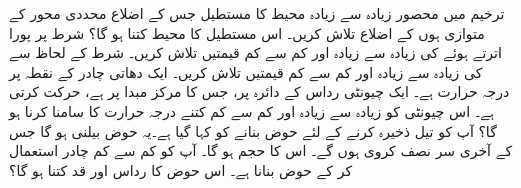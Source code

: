 ترخیم   میں محصور  زیادہ سے زیادہ محیط کا مستطیل جس کے اضلاع محددی  محور کے متوازی ہوں کے اضلاع  تلاش کریں۔ اس مستطیل کا محیط کتنا ہو گا؟
شرط    پر پورا  اترتے ہوئے   کی زیادہ سے زیادہ اور کم سے کم قیمتیں تلاش کریں۔
شرط  کے لحاظ سے  کی زیادہ سے زیادہ اور کم سے کم قیمتیں تلاش کریں۔
ایک دھاتی چادر کے نقطہ  پر درجہ حرارت  ہے۔ ایک چیونٹی  رداس   کے دائرہ پر،   جس کا مرکز مبدا پر ہے،   حرکت کرتی ہے۔ اس چیونٹی کو زیادہ سے زیادہ اور کم سے کم کتنے درجہ حرارت کا سامنا کرنا ہو گا؟ 
آپ کو  تیل ذخیرہ کرنے  کے لئے حوض  بنانے کو کہا گیا ہے۔یہ حوض بیلنی ہو گا جس کے آخری سر نصف کروی ہوں گے۔ اس کا حجم  ہو گا۔ آپ کو کم سے کم چادر استعمال کر کے حوض بنانا ہے۔ اس حوض کا رداس اور قد کتنا ہو گا؟ 

